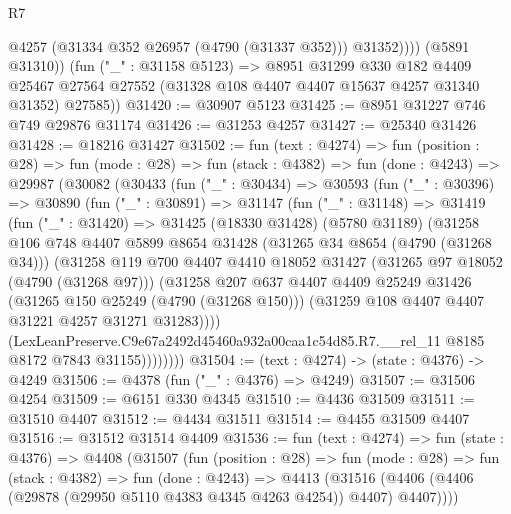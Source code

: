 \begin{lexlean}{R7}
\begin{coremodule}
                @4257
                (@31334 @352 @26957 (@4790 (@31337 @352)))
                @31352))))
        (@5891 @31310))
      (fun ("_" : @31158 @5123) =>
      @8951
        @31299
        @330
        @182
        @4409
        @25467
        @27564
        @27552
        (@31328 @108 @4407 @4407 @15637 @4257 @31340 @31352)
        @27585))
@31420 := @30907 @5123
@31425 := @8951 @31227 @746 @749 @29876 @31174
@31426 := @31253 @4257
@31427 := @25340 @31426
@31428 := @18216 @31427
@31502 := fun (text : @4274) =>
  fun (position : @28) =>
  fun (mode : @28) =>
  fun (stack : @4382) =>
  fun (done : @4243) =>
  @29987
    (@30082
      (@30433
        (fun ("_" : @30434) =>
        @30593
          (fun ("_" : @30396) =>
          @30890
            (fun ("_" : @30891) =>
            @31147
              (fun ("_" : @31148) =>
              @31419
                (fun ("_" : @31420) =>
                @31425
                  (@18330 @31428)
                  (@5780 @31189)
                  (@31258
                    @106
                    @748
                    @4407
                    @5899
                    @8654
                    @31428
                    (@31265 @34 @8654 (@4790 (@31268 @34)))
                    (@31258
                      @119
                      @700
                      @4407
                      @4410
                      @18052
                      @31427
                      (@31265 @97 @18052 (@4790 (@31268 @97)))
                      (@31258
                        @207
                        @637
                        @4407
                        @4409
                        @25249
                        @31426
                        (@31265 @150 @25249 (@4790 (@31268 @150)))
                        (@31259 @108 @4407 @4407 @31221 @4257 @31271 @31283))))
                  (LexLeanPreserve.C9e67a2492d45460a932a00caa1c54d85.R7.__rel_11
                    @8185
                    @8172
                    @7843
                    @31155))))))))
@31504 := (text : @4274) -> (state : @4376) -> @4249
@31506 := @4378 (fun ("_" : @4376) => @4249)
@31507 := @31506 @4254
@31509 := @6151 @330 @4345
@31510 := @4436 @31509
@31511 := @31510 @4407
@31512 := @4434 @31511
@31514 := @4455 @31509 @4407
@31516 := @31512 @31514 @4409
@31536 := fun (text : @4274) =>
  fun (state : @4376) =>
  @4408
    (@31507
      (fun (position : @28) =>
      fun (mode : @28) =>
      fun (stack : @4382) =>
      fun (done : @4243) =>
      @4413 (@31516 (@4406 (@4406 (@29878 (@29950 @5110 @4383 @4345 @4263 @4254)) @4407) @4407))))

\end{coremodule}
\end{lexlean}
